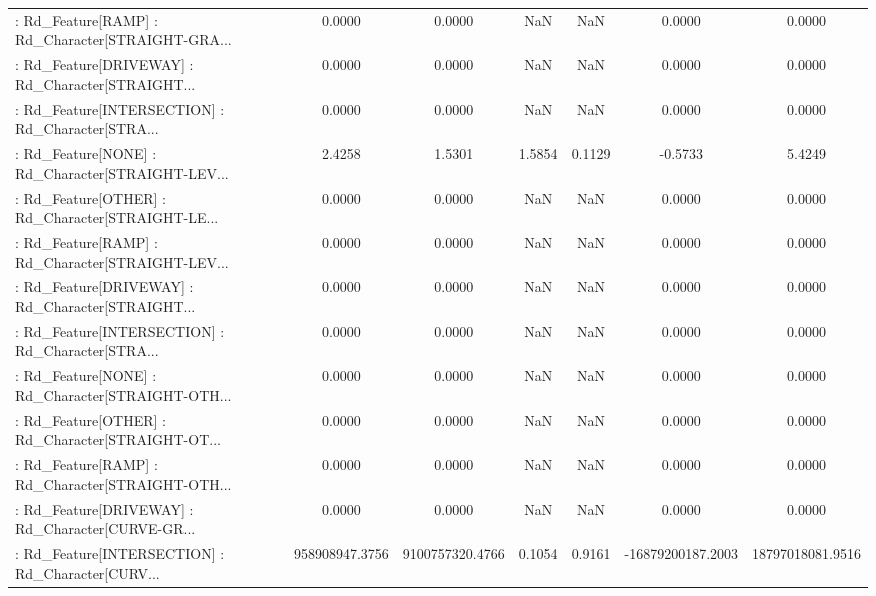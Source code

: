 \begin{longtable}{p{4cm}cccccc}
 : Rd\_Feature[RAMP] : Rd\_Character[STRAIGHT-GRA... &            0.0000 &            0.0000 &     NaN &          NaN &             0.0000 &            0.0000 \\
 : Rd\_Feature[DRIVEWAY] : Rd\_Character[STRAIGHT... &            0.0000 &            0.0000 &     NaN &          NaN &             0.0000 &            0.0000 \\
 : Rd\_Feature[INTERSECTION] : Rd\_Character[STRA... &            0.0000 &            0.0000 &     NaN &          NaN &             0.0000 &            0.0000 \\
 : Rd\_Feature[NONE] : Rd\_Character[STRAIGHT-LEV... &            2.4258 &            1.5301 &  1.5854 &       0.1129 &            -0.5733 &            5.4249 \\
 : Rd\_Feature[OTHER] : Rd\_Character[STRAIGHT-LE... &            0.0000 &            0.0000 &     NaN &          NaN &             0.0000 &            0.0000 \\
 : Rd\_Feature[RAMP] : Rd\_Character[STRAIGHT-LEV... &            0.0000 &            0.0000 &     NaN &          NaN &             0.0000 &            0.0000 \\
 : Rd\_Feature[DRIVEWAY] : Rd\_Character[STRAIGHT... &            0.0000 &            0.0000 &     NaN &          NaN &             0.0000 &            0.0000 \\
 : Rd\_Feature[INTERSECTION] : Rd\_Character[STRA... &            0.0000 &            0.0000 &     NaN &          NaN &             0.0000 &            0.0000 \\
 : Rd\_Feature[NONE] : Rd\_Character[STRAIGHT-OTH... &            0.0000 &            0.0000 &     NaN &          NaN &             0.0000 &            0.0000 \\
 : Rd\_Feature[OTHER] : Rd\_Character[STRAIGHT-OT... &            0.0000 &            0.0000 &     NaN &          NaN &             0.0000 &            0.0000 \\
 : Rd\_Feature[RAMP] : Rd\_Character[STRAIGHT-OTH... &            0.0000 &            0.0000 &     NaN &          NaN &             0.0000 &            0.0000 \\
 : Rd\_Feature[DRIVEWAY] : Rd\_Character[CURVE-GR... &            0.0000 &            0.0000 &     NaN &          NaN &             0.0000 &            0.0000 \\
 : Rd\_Feature[INTERSECTION] : Rd\_Character[CURV... &    958908947.3756 &   9100757320.4766 &  0.1054 &       0.9161 &  -16879200187.2003 &  18797018081.9516 \\

\end{longtable}
